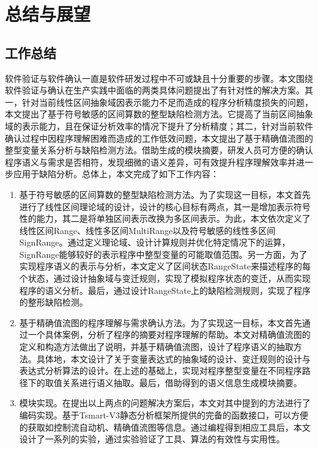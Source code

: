 
\chapter{总结与展望}

\section{工作总结}

软件验证与软件确认一直是软件研发过程中不可或缺且十分重要的步骤。本文围绕软件验证与确认在生产实践中面临的两类具体问题提出了有针对性的解决方案。其一，针对当前线性区间抽象域因表示能力不足而造成的程序分析精度损失的问题，本文提出了基于符号敏感的区间算数的整型缺陷检测方法。它提高了当前区间抽象域的表示能力，且在保证分析效率的情况下提升了分析精度；其二，针对当前软件确认过程中因程序理解困难而造成的工作低效问题，本文提出了基于精确值流图的整型变量关系分析与缺陷检测方法。借助生成的模块摘要，研发人员可方便的确认程序语义与需求是否相符，发现细微的语义差异，可有效提升程序理解效率并进一步应用于缺陷分析。总体上，本文完成了如下工作内容：

\begin{enumerate}[1）]
	\item 基于符号敏感的区间算数的整型缺陷检测方法。为了实现这一目标，本文首先进行了线性区间理论域的设计，设计的核心目标有两点，其一是增加表示符号性的能力，其二是将单独区间表示改换为多区间表示。为此，本文依次定义了线性区间Range、线性多区间MultiRange以及符号敏感的线性多区间SignRange。通过定义理论域、设计计算规则并优化特定情况下的运算，SignRange能够较好的表示程序中整型变量的可能取值范围。另一方面，为了实现程序语义的表示与分析，本文定义了区间状态RangeState来描述程序的每个状态，通过设计抽象域与变迁规则，实现了模拟程序状态的变迁，从而实现程序的语义分析。最后，通过设计RangeState上的缺陷检测规则，实现了程序的整形缺陷检测。
	
	\item 基于精确值流图的程序理解与需求确认方法。为了实现这一目标，本文首先通过一个具体案例，分析了程序的摘要对程序理解的帮助。本文对精确值流图的定义和构造方法做出了说明，并基于精确值流图，设计了程序语义的抽取方法。具体地，本文设计了关于变量表达式的抽象域的设计、变迁规则的设计与表达式分析算法的设计。在上述的基础上，实现对程序整型变量在不同程序路径下的取值关系进行语义抽取。最后，借助得到的语义信息生成模块摘要。
	
	\item 模块实现。在提出以上两点的问题解决方案后，本文对其中提到的方法进行了编码实现。基于Tsmart-V3静态分析框架所提供的完备的函数接口，可以方便的获取如控制流自动机、精确值流图等信息。通过编程得到相应工具后，本文设计了一系列的实验，通过实验验证了工具、算法的有效性与实用性。
\end{enumerate}

